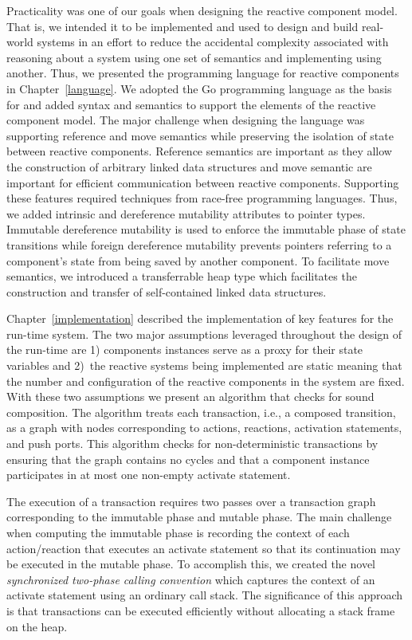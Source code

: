 Practicality was one of our goals when designing the reactive component model.
That is, we intended it to be implemented and used to design and build real-world systems in an effort to reduce the accidental complexity associated with reasoning about a system using one set of semantics and implementing using another.
Thus, we presented the \rcgo{} programming language for reactive components in Chapter~\ref{language}.
We adopted the Go programming language as the basis for \rcgo{} and added syntax and semantics to support the elements of the reactive component model.
The major challenge when designing the language was supporting reference and move semantics while preserving the isolation of state between reactive components.
Reference semantics are important as they allow the construction of arbitrary linked data structures and move semantic are important for efficient communication between reactive components.
Supporting these features required techniques from race-free programming languages.
Thus, we added intrinsic and dereference mutability attributes to pointer types.
Immutable dereference mutability is used to enforce the immutable phase of state transitions while foreign dereference mutability prevents pointers referring to a component's state from being saved by another component.
To facilitate move semantics, we introduced a transferrable heap type which facilitates the construction and transfer of self-contained linked data structures.

Chapter~\ref{implementation} described the implementation of key features for the \rcgo{} run-time system.
The two major assumptions leveraged throughout the design of the run-time are 1) components instances serve as a proxy for their state variables and 2)~the reactive systems being implemented are static meaning that the number and configuration of the reactive components in the system are fixed.
With these two assumptions we present an algorithm that checks for sound composition.
The algorithm treats each transaction, i.e., a composed transition, as a graph with nodes corresponding to actions, reactions, activation statements, and push ports.
This algorithm checks for non-deterministic transactions by ensuring that the graph contains no cycles and that a component instance participates in at most one non-empty activate statement.

The execution of a transaction requires two passes over a transaction graph corresponding to the immutable phase and mutable phase.
The main challenge when computing the immutable phase is recording the context of each action/reaction that executes an activate statement so that its continuation may be executed in the mutable phase.
To accomplish this, we created the novel \emph{synchronized two-phase calling convention} which captures the context of an activate statement using an ordinary call stack.
The significance of this approach is that transactions can be executed efficiently without allocating a stack frame on the heap.

